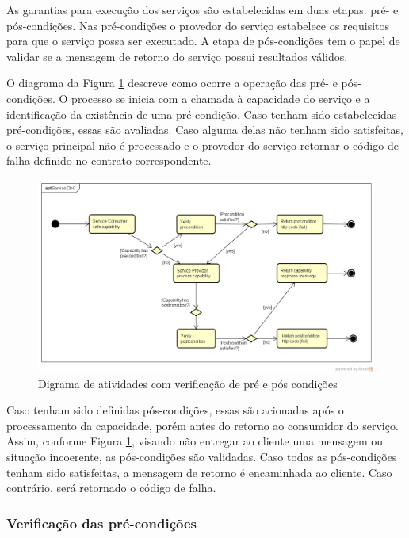 As garantias para execução dos serviços são estabelecidas em duas etapas: pré- e
pós-condições. Nas pré-condições o provedor do serviço estabelece os requisitos
para que o serviço possa ser executado. A etapa de pós-condições tem o papel de
validar se a mensagem de retorno do serviço possui resultados válidos.

O diagrama da Figura \ref{FigServiceDbC} descreve como ocorre a operação das
pré- e pós-condições. O processo se inicia com a chamada à capacidade do serviço e a
identificação da existência de uma pré-condição. Caso tenham sido estabelecidas 
pré-condições, essas são avaliadas. Caso alguma delas não tenham sido
satisfeitas, o serviço principal não é processado e o provedor do serviço
retornar o código de falha definido no contrato correspondente.


\begin{figure}[!htb]
\centering
\includegraphics[width=\textwidth,trim = 0mm 5mm 0mm 0mm,clip]{ServiceDbC.png}
\caption{Digrama de atividades com verificação de pré e pós condições}
\label{FigServiceDbC}
\end{figure}

Caso tenham sido definidas pós-condições, essas são acionadas após o
processamento da capacidade, porém antes do retorno ao consumidor do serviço.
Assim, conforme Figura \ref{FigServiceDbC}, visando não entregar ao cliente uma
mensagem ou situação incoerente, as pós-condições são validadas. Caso todas as
pós-condições tenham sido satisfeitas, a mensagem de retorno é encaminhada ao
cliente. Caso contrário, será retornado o código de falha.


\vspace{-6mm}


\subsubsection{Verificação das pré-condições}
\vspace{-6mm}

